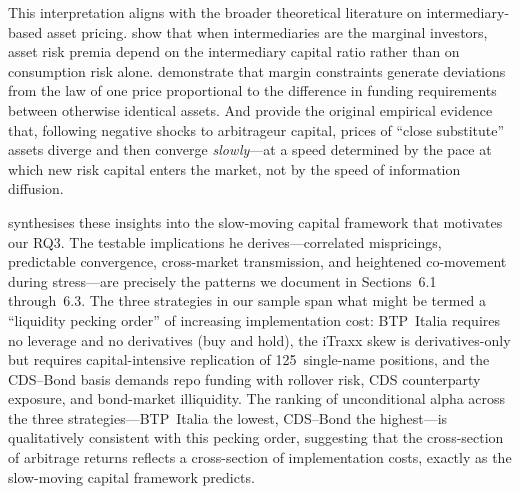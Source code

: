 This interpretation aligns with the broader theoretical literature on
intermediary-based asset pricing.  \citet{he2017intermediary} show that when
intermediaries are the marginal investors, asset risk premia depend on the
intermediary capital ratio rather than on consumption risk alone.
\citet{garleanu2011margin} demonstrate that margin constraints generate
deviations from the law of one price proportional to the difference in funding
requirements between otherwise identical assets.  And
\citet{mitchell2007slow} provide the original empirical evidence
that, following negative shocks to arbitrageur capital, prices of ``close
substitute'' assets diverge and then converge \emph{slowly}---at a speed
determined by the pace at which new risk capital enters the market, not by the
speed of information diffusion.

\citet{duffie2010presidential} synthesises these insights into the
slow-moving capital framework that motivates our RQ3.  The testable
implications he derives---correlated mispricings, predictable convergence,
cross-market transmission, and heightened co-movement during stress---are
precisely the patterns we document in Sections~6.1 through~6.3.  The three
strategies in our sample span what might be termed a ``liquidity pecking
order'' of increasing implementation cost: BTP~Italia requires no leverage and
no derivatives (buy and hold), the iTraxx skew is derivatives-only but requires
capital-intensive replication of 125~single-name positions, and the CDS--Bond
basis demands repo funding with rollover risk, CDS counterparty exposure, and
bond-market illiquidity.  The ranking of unconditional alpha across the three
strategies---BTP~Italia the lowest, CDS--Bond the highest---is qualitatively
consistent with this pecking order, suggesting that the cross-section of
arbitrage returns reflects a cross-section of implementation costs, exactly as
the slow-moving capital framework predicts.